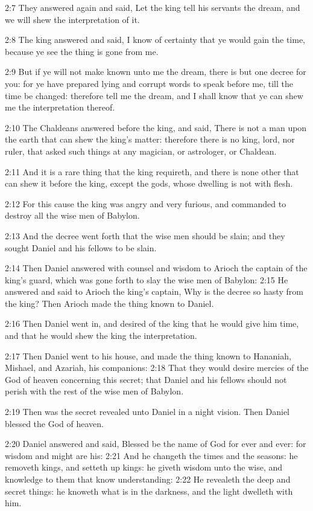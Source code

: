 2:7 They answered again and said, Let the king tell his servants the
dream, and we will shew the interpretation of it.

2:8 The king answered and said, I know of certainty that ye would gain
the time, because ye see the thing is gone from me.

2:9 But if ye will not make known unto me the dream, there is but one
decree for you: for ye have prepared lying and corrupt words to speak
before me, till the time be changed: therefore tell me the dream, and
I shall know that ye can shew me the interpretation thereof.

2:10 The Chaldeans answered before the king, and said, There is not a
man upon the earth that can shew the king's matter: therefore there is
no king, lord, nor ruler, that asked such things at any magician, or
astrologer, or Chaldean.

2:11 And it is a rare thing that the king requireth, and there is none
other that can shew it before the king, except the gods, whose
dwelling is not with flesh.

2:12 For this cause the king was angry and very furious, and commanded
to destroy all the wise men of Babylon.

2:13 And the decree went forth that the wise men should be slain; and
they sought Daniel and his fellows to be slain.

2:14 Then Daniel answered with counsel and wisdom to Arioch the
captain of the king's guard, which was gone forth to slay the wise men
of Babylon: 2:15 He answered and said to Arioch the king's captain,
Why is the decree so hasty from the king? Then Arioch made the thing
known to Daniel.

2:16 Then Daniel went in, and desired of the king that he would give
him time, and that he would shew the king the interpretation.

2:17 Then Daniel went to his house, and made the thing known to
Hananiah, Mishael, and Azariah, his companions: 2:18 That they would
desire mercies of the God of heaven concerning this secret; that
Daniel and his fellows should not perish with the rest of the wise men
of Babylon.

2:19 Then was the secret revealed unto Daniel in a night vision. Then
Daniel blessed the God of heaven.

2:20 Daniel answered and said, Blessed be the name of God for ever and
ever: for wisdom and might are his: 2:21 And he changeth the times and
the seasons: he removeth kings, and setteth up kings: he giveth wisdom
unto the wise, and knowledge to them that know understanding: 2:22 He
revealeth the deep and secret things: he knoweth what is in the
darkness, and the light dwelleth with him.

